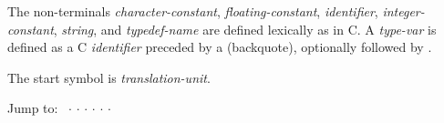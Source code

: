 The non-terminals
\hypertarget{character-constant}{\textit{character-constant}},
\hypertarget{floating-constant}{\textit{floating-constant}},
\hypertarget{identifier}{\textit{identifier}},
\hypertarget{integer-constant}{\textit{integer-constant}},
\hypertarget{string}{\textit{string}},
and
\hypertarget{typedef-name}{\textit{typedef-name}}
are defined lexically as in C\@.
A \hypertarget{type-var}{\textit{type-var}} is defined as
a C \textit{identifier} preceded by a  (backquote), 
optionally followed by \tk{::}.

The start symbol is \textit{translation-unit}.

\ifscreen
{\footnotesize
\medskip
\noindent
Jump to:~ $\cdot$
 $\cdot$
 $\cdot$
 $\cdot$
 $\cdot$
 $\cdot$

\medskip
}
\fi


